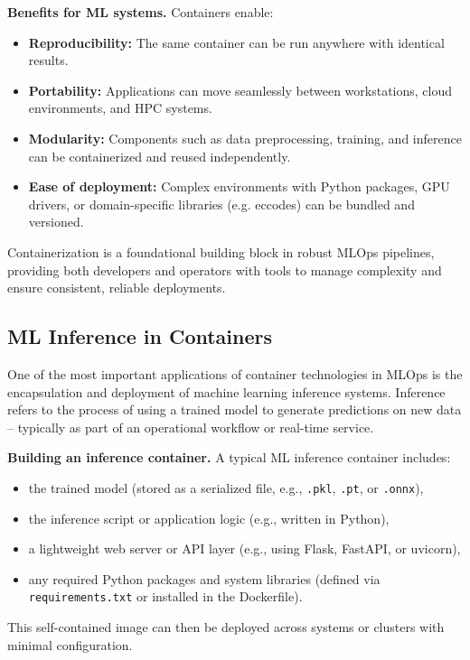 {\bf Benefits for ML systems.} Containers enable:
\begin{itemize}
	\item \textbf{Reproducibility:} The same container can be run anywhere with identical results.
	\item \textbf{Portability:} Applications can move seamlessly between workstations, cloud environments, and HPC systems.
	\item \textbf{Modularity:} Components such as data preprocessing, training, and inference can be containerized and reused independently.
	\item \textbf{Ease of deployment:} Complex environments with Python packages, GPU drivers, or domain-specific libraries (e.g. eccodes) can be bundled and versioned.
\end{itemize}

Containerization is a foundational building block in robust MLOps pipelines, providing both developers and operators with tools to manage complexity and ensure consistent, reliable deployments.


%
\subsection{ML Inference in Containers}

One of the most important applications of container technologies in MLOps is the encapsulation and deployment of machine learning inference systems. Inference refers to the process of using a trained model to generate predictions on new data -- typically as part of an operational workflow or real-time service.

{\bf Building an inference container.} A typical ML inference container includes:
\begin{itemize}
	\item the trained model (stored as a serialized file, e.g., \texttt{.pkl}, \texttt{.pt}, or \texttt{.onnx}),
	\item the inference script or application logic (e.g., written in Python),
	\item a lightweight web server or API layer (e.g., using Flask, FastAPI, or uvicorn),
	\item any required Python packages and system libraries (defined via \texttt{requirements.txt} or installed in the Dockerfile).
\end{itemize}
This self-contained image can then be deployed across systems or clusters with minimal configuration.

